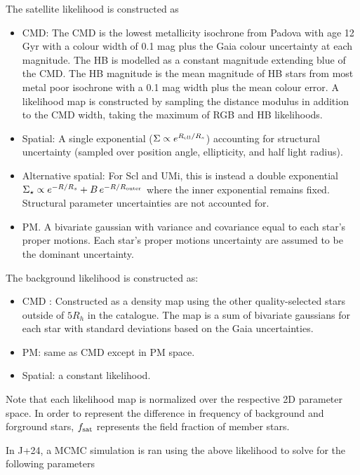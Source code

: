 The satellite likelihood is constructed as

\begin{itemize}
\tightlist
\item
  CMD: The CMD is the lowest metallicity isochrone from Padova
  \citep{girardi+2002} with age 12 Gyr with a colour width of 0.1 mag
  plus the Gaia colour uncertainty at each magnitude. The HB is modelled
  as a constant magnitude extending blue of the CMD. The HB magnitude is
  the mean magnitude of HB stars from most metal poor isochrone with a
  0.1 mag width plus the mean colour error. A likelihood map is
  constructed by sampling the distance modulus in addition to the CMD
  width, taking the maximum of RGB and HB likelihoods.
\item
  Spatial: A single exponential
  (\(\Sigma \propto e^{R_{\rm ell} / R_s}\)) accounting for structural
  uncertainty (sampled over position angle, ellipticity, and half light
  radius).
\item
  Alternative spatial: For Scl and UMi, this is instead a double
  exponential
  \(\Sigma_\star \propto e^{-R/R_s} + B\,e^{-R/R_{\rm outer}}\) where
  the inner exponential remains fixed. Structural parameter
  uncertainties are not accounted for.
\item
  PM. A bivariate gaussian with variance and covariance equal to each
  star's proper motions. Each star's proper motions uncertainty are
  assumed to be the dominant uncertainty.
\end{itemize}

The background likelihood is constructed as:

\begin{itemize}
\tightlist
\item
  CMD : Constructed as a density map using the other quality-selected
  stars outside of \(5R_h\) in the catalogue. The map is a sum of
  bivariate gaussians for each star with standard deviations based on
  the Gaia uncertainties.
\item
  PM: same as CMD except in PM space.
\item
  Spatial: a constant likelihood.
\end{itemize}

Note that each likelihood map is normalized over the respective 2D
parameter space. In order to represent the difference in frequency of
background and forground stars, \(f_{\rm sat}\) represents the field
fraction of member stars.

In J+24, a MCMC simulation is ran using the above likelihood to solve
for the following parameters

